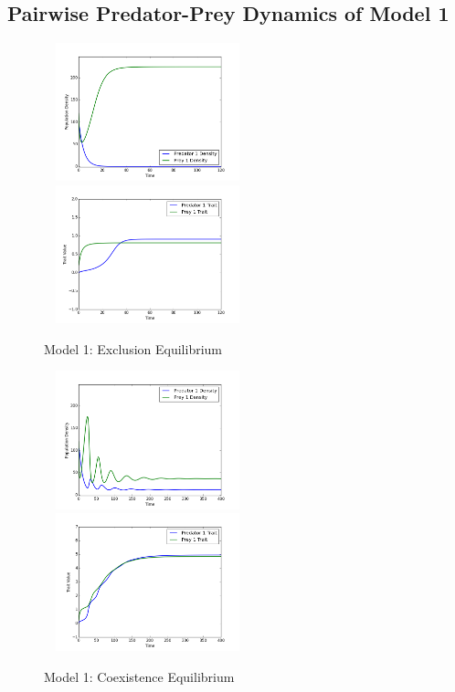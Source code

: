 \documentclass{amsart}
\theoremstyle{definition}
\theoremstyle{remark}
\numberwithin{equation}{section}
\begin{document}
\subsection{Pairwise Predator-Prey Dynamics of Model 1}
\begin{centering}
	\begin{figure}
		\includegraphics[width=6cm,height=4cm]{figures/1x1/constant_growth/densities_exclusion.png}
		\includegraphics[width=6cm,height=4cm]{figures/1x1/constant_growth/traits_exclusion.png}
		\caption{Model 1: Exclusion Equilibrium}
		\label{fig:constant_growth_exclusion}
	\end{figure}
	\begin{figure}
		\includegraphics[width=6cm,height=4cm]{figures/1x1/constant_growth/densities_stable_coexistence.png}
		\includegraphics[width=6cm,height=4cm]{figures/1x1/constant_growth/traits_stable_coexistence.png}
		\caption{Model 1: Coexistence Equilibrium}

\end{figure}
\end{centering}
\end{document}
